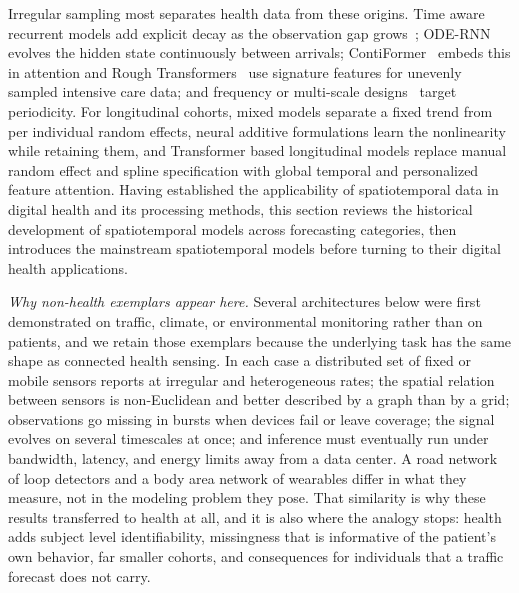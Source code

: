 \documentclass[journal]{IEEEtran}
\begin{document}
Irregular sampling most separates health data from these origins. Time aware recurrent models add explicit decay as the observation gap grows~\cite{metzger2023crop}; ODE-RNN~\cite{rubanova2019latent} evolves the hidden state continuously between arrivals; ContiFormer~\cite{chen2023contiformer} embeds this in attention and Rough Transformers~\cite{morenopino2024rough} use signature features for unevenly sampled intensive care data; and frequency or multi-scale designs~\cite{zhou2022fedformer,wang2023micn} target periodicity. For longitudinal cohorts, mixed models separate a fixed trend from per individual random effects, neural additive formulations learn the nonlinearity while retaining them, and Transformer based longitudinal models replace manual random effect and spline specification with global temporal and personalized feature attention.
\else
Having established the applicability of spatiotemporal data in digital health and its processing methods, this section reviews the historical development of spatiotemporal models across forecasting categories, then introduces the mainstream spatiotemporal models before turning to their digital health applications.

\emph{Why non-health exemplars appear here.} Several architectures below were first demonstrated on traffic, climate, or environmental monitoring rather than on patients, and we retain those exemplars because the underlying task has the same shape as connected health sensing. In each case a distributed set of fixed or mobile sensors reports at irregular and heterogeneous rates; the spatial relation between sensors is non-Euclidean and better described by a graph than by a grid; observations go missing in bursts when devices fail or leave coverage; the signal evolves on several timescales at once; and inference must eventually run under bandwidth, latency, and energy limits away from a data center. A road network of loop detectors and a body area network of wearables differ in what they measure, not in the modeling problem they pose. That similarity is why these results transferred to health at all, and it is also where the analogy stops: health adds subject level identifiability, missingness that is informative of the patient's own behavior, far smaller cohorts, and consequences for individuals that a traffic forecast does not carry.
\end{document}
